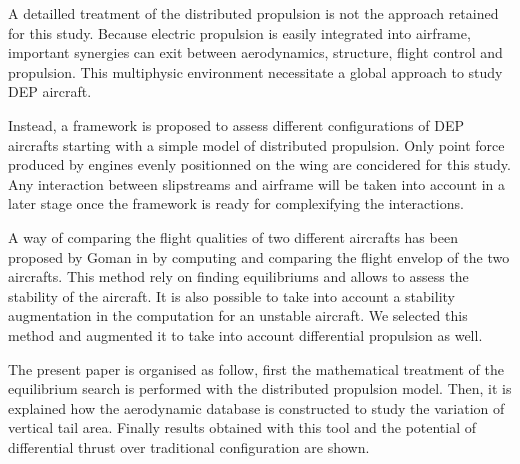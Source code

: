 A detailled treatment of the distributed propulsion is not the approach retained for this study. Because electric propulsion is easily integrated into airframe, important synergies can exit between aerodynamics, structure, flight control and propulsion. This multiphysic environment necessitate a global approach to study DEP aircraft. %

Instead, a framework is proposed to assess different configurations of DEP aircrafts starting with a simple model of distributed propulsion. Only point force produced by engines evenly positionned on the wing are concidered for this study. Any interaction between slipstreams and airframe will be taken into account in a later stage once the framework is ready for complexifying the interactions.

A way of comparing the flight qualities of two different aircrafts has been proposed by Goman in \cite{GomanAttainableEqui} by computing and comparing the flight envelop of the two aircrafts. This method rely on finding equilibriums and allows to assess the stability of the aircraft. It is also possible to take into account a stability augmentation in the computation for an unstable aircraft. We selected this method and augmented it to take into account differential propulsion as well.

The present paper is organised as follow, first the mathematical treatment of the equilibrium search is performed with the distributed propulsion model. Then, it is explained how the aerodynamic database is constructed to study the variation of vertical tail area. Finally results obtained with this tool and the potential of differential thrust over traditional configuration are shown.

%
